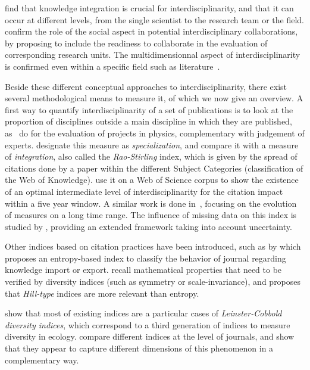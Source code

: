 \cite{wagner2011approaches} find that knowledge integration is crucial for interdisciplinarity, and that it can occur at different levels, from the single scientist to the research team or the field. \cite{hall2008collaboration} confirm the role of the social aspect in potential interdisciplinary collaborations, by proposing to include the readiness to collaborate in the evaluation of corresponding research units. The multidimensionnal aspect of interdisciplinarity is confirmed even within a specific field such as literature~\citep{austin1996defining}.

Beside these different conceptual approaches to interdisciplinarity, there exist several methodological means to measure it, of which we now give an overview. A first way to quantify interdisciplinarity of a set of publications is to look at the proportion of disciplines outside a main discipline in which they are published, as~\cite{rinia2002impact} do for the evaluation of projects in physics, complementary with judgement of experts. \cite{porter2007measuring} designate this measure as \emph{specialization}, and compare it with a measure of \emph{integration}, also called the \emph{Rao-Stirling} index, which is given by the spread of citations done by a paper within the different Subject Categories (classification of the Web of Knowledge).\cite{lariviere2010relationship} use it on a Web of Science corpus to show the existence of an optimal intermediate level of interdisciplinarity for the citation impact within a five year window. A similar work is done in~\citep{lariviere201410}, focusing on the evolution of measures on a long time range. The influence of missing data on this index is studied by \cite{moreno2016uncertainty}, providing an extended framework taking into account uncertainty.

Other indices based on citation practices have been introduced, such as by \cite{rodriguez2017disciplinarity} which proposes an entropy-based index to classify the behavior of journal regarding knowledge import or export. \cite{zhang2016diversity} recall mathematical properties that need to be verified by diversity indices (such as symmetry or scale-invariance), and proposes that \emph{Hill-type} indices are more relevant than entropy.

\cite{mugabushaka2016bibliometric} show that most of existing indices are a particular cases of \emph{Leinster-Cobbold diversity indices}, which correspond to a third generation of indices to measure diversity in ecology. \cite{leydesdorff2011indicators} compare different indices at the level of journals, and show that they appear to capture different dimensions of this phenomenon in a complementary way.


